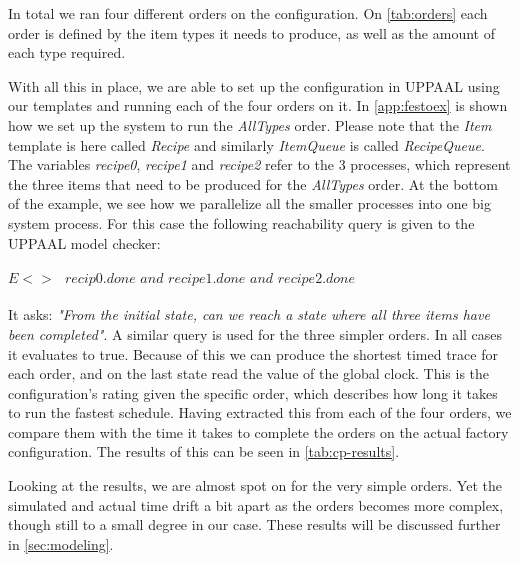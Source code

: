 

In total we ran four different orders on the configuration. On \cref{tab:orders} each order is defined by the item types it needs to produce, as well as the amount of each type required.   



With all this in place, we are able to set up the configuration in UPPAAL using our templates and running each of the four orders on it. In \cref{app:festoex} is shown how we set up the system to run the \textit{AllTypes} order. Please note that the \textit{Item} template is here called \textit{Recipe} and similarly \textit{ItemQueue} is called \textit{RecipeQueue}. The variables \textit{recipe0}, \textit{recipe1} and \textit{recipe2} refer to the 3 processes, which represent the three items that need to be produced for the \textit{AllTypes} order. At the bottom of the example, we see how we parallelize all the smaller processes into one big system process. For this case the following reachability query is given to the UPPAAL model checker:
\\ \\
$E<>\textit{ }recip0.done\textit{ and }recipe1.done\textit{ and }recipe2.done$
\\ \\
It asks: \textit{"From the initial state, can we reach a state where all three items have been completed"}. A similar query is used for the three simpler orders. In all cases it evaluates to true. Because of this we can produce the shortest timed trace for each order, and on the last state read the value of the global clock. This is the configuration's rating given the specific order, which describes how long it takes to run the fastest schedule. Having extracted this from each of the four orders, we compare them with the time it takes to complete the orders on the actual factory configuration. The results of this can be seen in \cref{tab:cp-results}.



Looking at the results, we are almost spot on for the very simple orders. Yet the simulated and actual time drift a bit apart as the orders becomes more complex, though still to a small degree in our case. These results will be discussed further in \cref{sec:modeling}.
